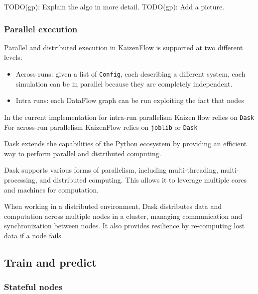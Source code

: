 \documentclass[11pt, reqno]{amsart}
\theoremstyle{definition}
\theoremstyle{remark}
\begin{document}
TODO(gp): Explain the algo in more detail.
TODO(gp): Add a picture.

\subsubsection{Parallel execution}

Parallel and distributed execution in KaizenFlow is supported at two different
levels:
\begin{itemize}
  \item Across runs:
        given a list of \verb|Config|, each describing a different system, each
        simulation can be in parallel because they are completely independent.
  \item Intra runs:
        each DataFlow graph can be run exploiting the fact that nodes
\end{itemize}

In the current implementation for intra-run parallelism Kaizen flow relies on
\verb|Dask|
For across-run parallelism KaizenFlow relies on \verb|joblib| or \verb|Dask|

Dask extends the capabilities of the Python ecosystem by providing an efficient
way to perform parallel and distributed computing.

Dask supports various forms of parallelism, including multi-threading,
multi-processing, and distributed computing. This allows it to leverage
multiple cores and machines for computation.

When working in a distributed environment, Dask distributes data and
computation across multiple nodes in a cluster, managing communication and
synchronization between nodes. It also provides resilience by re-computing lost
data if a node fails.

\subsection{Train and predict}


\subsubsection{Stateful nodes}
\end{document}
